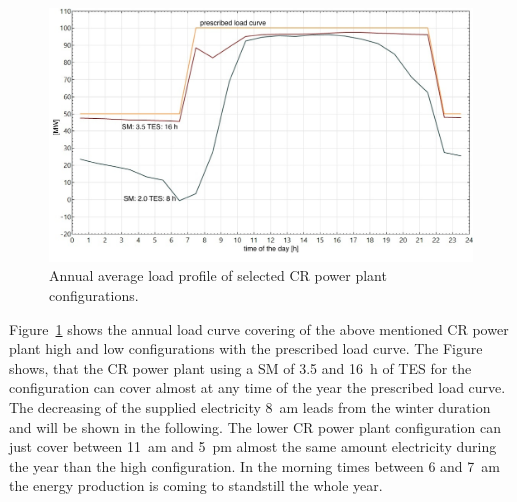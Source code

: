 \begin{figure}[htbp]  
\centering
\includegraphics[width=0.8\linewidth]{FIG/CR_annual_profil}
\caption[Annual average load profile of selected CR power plant configurations.]{Annual average load profile of selected CR power plant configurations.}\label{CR_annual_profil}
\end{figure}
Figure~\ref{CR_annual_profil} shows the annual load curve covering of the above mentioned CR power plant high and low configurations with the prescribed load curve. The Figure shows, that the CR power plant using a SM of 3.5 and 16~h of TES for the configuration can cover almost at any time of the year the prescribed load curve. The decreasing of the supplied electricity 8~am leads from the winter duration and will be shown in the following. The lower CR power plant configuration can just cover between 11~am and 5~pm almost the same amount electricity during the year than the high configuration. In the morning times between 6 and 7~am the energy production is coming to standstill the whole year.

